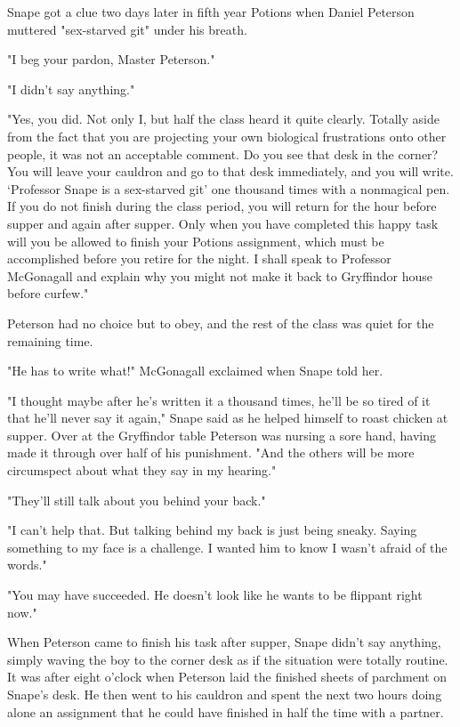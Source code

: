 Snape got a clue two days later in fifth year Potions when Daniel Peterson muttered "sex-starved git" under his breath.

"I beg your pardon, Master Peterson."

"I didn't say anything."

"Yes, you did. Not only I, but half the class heard it quite clearly. Totally aside from the fact that you are projecting your own biological frustrations onto other people, it was not an acceptable comment. Do you see that desk in the corner? You will leave your cauldron and go to that desk immediately, and you will write. `Professor Snape is a sex-starved git' one thousand times with a nonmagical pen. If you do not finish during the class period, you will return for the hour before supper and again after supper. Only when you have completed this happy task will you be allowed to finish your Potions assignment, which must be accomplished before you retire for the night. I shall speak to Professor McGonagall and explain why you might not make it back to Gryffindor house before curfew."

Peterson had no choice but to obey, and the rest of the class was quiet for the remaining time.

"He has to write what!" McGonagall exclaimed when Snape told her.

"I thought maybe after he's written it a thousand times, he'll be so tired of it that he'll never say it again," Snape said as he helped himself to roast chicken at supper. Over at the Gryffindor table Peterson was nursing a sore hand, having made it through over half of his punishment. "And the others will be more circumspect about what they say in my hearing."

"They'll still talk about you behind your back."

"I can't help that. But talking behind my back is just being sneaky. Saying something to my face is a challenge. I wanted him to know I wasn't afraid of the words."

"You may have succeeded. He doesn't look like he wants to be flippant right now."

When Peterson came to finish his task after supper, Snape didn't say anything, simply waving the boy to the corner desk as if the situation were totally routine. It was after eight o'clock when Peterson laid the finished sheets of parchment on Snape's desk. He then went to his cauldron and spent the next two hours doing alone an assignment that he could have finished in half the time with a partner.


